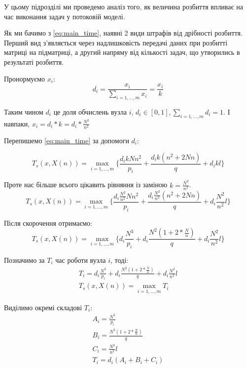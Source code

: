 У цьому підрозділі ми проведемо аналіз того, як величина розбиття впливає на час виконання задач у потоковій моделі.

Як ми бачимо з \ref{eq:main_time}, наявні 2 види штрафів від дрібності розбиття. Перший вид з'являється через надлишковість передачі даних при розбитті матриці на підматриці, а другий напряму від кількості задач, що утворились в результаті розбиття.

Пронормуємо $x_i$:
\begin{equation}
	\label{eq:d_i}
	d_i = \frac{x_i}{\sum\limits_{i=1,\ldots,m} x_i} = \frac{x_i}{k}
\end{equation}

Таким чином $d_i$ це доля обчислень вузла $i$, $d_i \in [0, 1], \sum\limits_{i=1,\ldots,m} d_i = 1$. І навпаки, $x_i = d_i * k = d_i * \frac{N^2}{n^2}$

Перепишемо \ref{eq:main_time} за допомоги $d_i$:

\begin{equation}
	\label{eq:main_time_d_i}
	T_s(x,X(n)) = \max\limits_{i=1,\ldots,m} \bigg\{ \frac{d_i k N n^2}{p_i} + \frac{d_i k(n^2 + 2 N n )}{q} + d_i k l \bigg\}
\end{equation}

Проте нас більше всього цікавить рівняння із заміною $k = \frac{N^2}{n^2}$.
\begin{equation}
\label{eq:main_time_d_i_2}
T_s(x,X(n)) = \max\limits_{i=1,\ldots,m} \bigg\{ \frac{d_i \frac{N^2}{n^2} N n^2}{p_i} + \frac{d_i \frac{N^2}{n^2}(n^2 + 2 N n )}{q} + d_i \frac{N^2}{n^2} l \bigg\}
\end{equation}

Після скорочення отримаємо:
\begin{equation}
\label{eq:main_time_d_i_final}
T_s(x,X(n)) = \max\limits_{i=1,\ldots,m} \bigg\{ d_i \frac{N^3}{p_i} + d_i \frac{N^2 ( 1 + 2*\frac{N}{n} )}{q} + d_i \frac{N^2}{n^2} l \bigg\}
\end{equation}

Позначимо за $T_i$ час роботи вузла $i$, тоді:
\begin{equation}
	\begin{gathered} 
		T_i = d_i \frac{N^3}{p_i} + d_i \frac{N^2 ( 1 + 2*\frac{N}{n} )}{q} + d_i \frac{N^2}{n^2} l \\
		T_s(x,X(n)) = \max\limits_{i=1,\ldots,m} T_i
	\end{gathered} 
\end{equation}

Виділимо окремі складові $T_i$:
\begin{equation}
	\begin{gathered} 
		A_i = \frac{N^3}{p_i} \\
		B_i = \frac{N^2 ( 1 + 2*\frac{N}{n} )}{q} \\
		C_i = \frac{N^2}{n^2} l \\
		T_i = d_i ( A_i + B_i + C_i )
	\end{gathered} 
	\label{eq:T_i_parts}
\end{equation}

